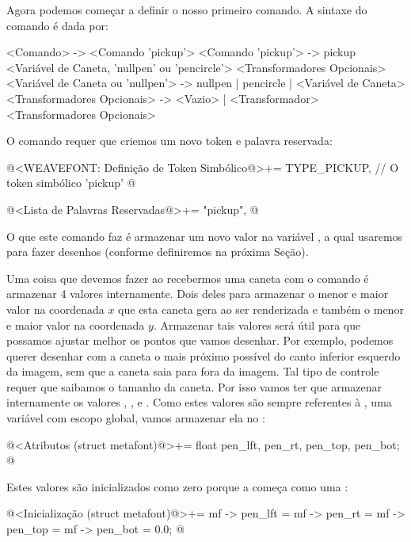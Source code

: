 {{{{{{

Agora podemos começar a definir o nosso primeiro comando. A sintaxe do
comando  é dada por:

\alinhaverbatim
<Comando> -> <Comando 'pickup'>
<Comando 'pickup'> -> pickup <Variável de Caneta, 'nullpen' ou 'pencircle'>
                             <Transformadores Opcionais>
<Variável de Caneta ou 'nullpen'> -> nullpen | pencircle | <Variável de Caneta>
<Transformadores Opcionais> -> <Vazio> |
                               <Transformador> <Transformadores Opcionais>
\alinhanormal

O comando requer que criemos um novo token e palavra reservada:

\iniciocodigo
@<WEAVEFONT: Definição de Token Simbólico@>+=
TYPE_PICKUP,   // O token simbólico 'pickup'
@
\fimcodigo

\iniciocodigo
@<Lista de Palavras Reservadas@>+=
"pickup",
@
\fimcodigo

O que este comando faz é armazenar um novo valor na
variável , a qual usaremos para fazer desenhos
(conforme definiremos na próxima Seção).


Uma coisa que devemos fazer ao recebermos uma caneta com o
comando  é armazenar 4 valores internamente. Dois
deles para armazenar o menor e maior valor na coordenada $x$ que esta
caneta gera ao ser renderizada e também o menor e maior valor na
coordenada $y$. Armazenar tais valores será útil para que possamos
ajustar melhor os pontos que vamos desenhar. Por exemplo, podemos
querer desenhar com a caneta o mais próximo possível do canto inferior
esquerdo da imagem, sem que a caneta saia para fora da imagem. Tal
tipo de controle requer que saibamos o tamanho da caneta. Por isso
vamos ter que armazenar internamente os
valores , , 
e . Como estes valores são sempre referentes
à , uma variável com escopo global, vamos
armazenar ela no :

\iniciocodigo
@<Atributos (struct metafont)@>+=
float pen_lft, pen_rt, pen_top, pen_bot;
@
\fimcodigo

Estes valores são inicializados como zero porque
a  começa como uma :

\iniciocodigo
@<Inicialização (struct metafont)@>+=
mf -> pen_lft = mf -> pen_rt = mf -> pen_top = mf -> pen_bot = 0.0;
@
\fimcodigo

}}}}}}
